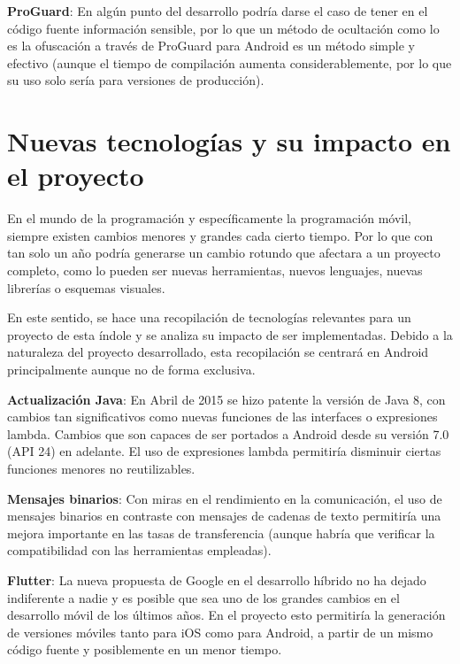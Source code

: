 \textbf{ProGuard}\cite{proguard}: En algún punto del desarrollo podría darse el caso de tener en el código fuente información sensible, por lo que un método de ocultación como lo es la ofuscación a través de ProGuard para Android es un método simple y efectivo (aunque el tiempo de compilación aumenta considerablemente, por lo que su uso solo sería para versiones de producción).

\newpage

\section{Nuevas tecnologías y su impacto en el proyecto}

En el mundo de la programación y específicamente la programación móvil, siempre existen cambios menores y grandes cada cierto tiempo. Por lo que con tan solo un año podría generarse un cambio rotundo que afectara a un proyecto completo, como lo pueden ser nuevas herramientas, nuevos lenguajes, nuevas librerías o esquemas visuales.

En este sentido, se hace una recopilación de tecnologías relevantes para un proyecto de esta índole y se analiza su impacto de ser implementadas. Debido a la naturaleza del proyecto desarrollado, esta recopilación se centrará en Android principalmente aunque no de forma exclusiva.

\textbf{Actualización Java}\cite{java8}: En Abril de 2015 se hizo patente la versión de Java 8, con cambios tan significativos como nuevas funciones de las interfaces o expresiones lambda. Cambios que son capaces de ser portados a Android desde su versión 7.0 (API 24) en adelante. El uso de expresiones lambda permitiría disminuir ciertas funciones menores no reutilizables.

\textbf{Mensajes binarios}: Con miras en el rendimiento en la comunicación, el uso de mensajes binarios en contraste con mensajes de cadenas de texto permitiría una mejora importante en las tasas de transferencia (aunque habría que verificar la compatibilidad con las herramientas empleadas).

\textbf{Flutter}\cite{flutter}: La nueva propuesta de Google en el desarrollo híbrido no ha dejado indiferente a nadie y es posible que sea uno de los grandes cambios en el desarrollo móvil de los últimos años. En el proyecto esto permitiría la generación de versiones móviles tanto para iOS como para Android, a partir de un mismo código fuente y posiblemente en un menor tiempo.

